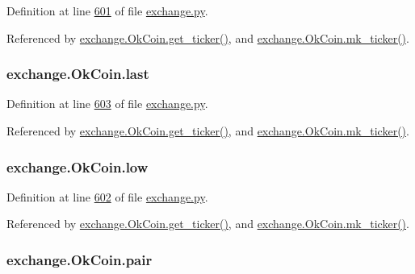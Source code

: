 Definition at line \hyperlink{exchange_8py_source_l00601}{601} of file \hyperlink{exchange_8py_source}{exchange.\+py}.



Referenced by \hyperlink{exchange_8py_source_l00608}{exchange.\+Ok\+Coin.\+get\+\_\+ticker()}, and \hyperlink{exchange_8py_source_l00622}{exchange.\+Ok\+Coin.\+mk\+\_\+ticker()}.

\subsubsection[{\texorpdfstring{last}{last}}]{\setlength{\rightskip}{0pt plus 5cm}exchange.\+Ok\+Coin.\+last}\hypertarget{classexchange_1_1_ok_coin_a726afbe3a75835fdcbe523aed8d6763c}{}\label{classexchange_1_1_ok_coin_a726afbe3a75835fdcbe523aed8d6763c}


Definition at line \hyperlink{exchange_8py_source_l00603}{603} of file \hyperlink{exchange_8py_source}{exchange.\+py}.



Referenced by \hyperlink{exchange_8py_source_l00608}{exchange.\+Ok\+Coin.\+get\+\_\+ticker()}, and \hyperlink{exchange_8py_source_l00622}{exchange.\+Ok\+Coin.\+mk\+\_\+ticker()}.

\subsubsection[{\texorpdfstring{low}{low}}]{\setlength{\rightskip}{0pt plus 5cm}exchange.\+Ok\+Coin.\+low}\hypertarget{classexchange_1_1_ok_coin_a1afa53e0ad63830d0585288abea42094}{}\label{classexchange_1_1_ok_coin_a1afa53e0ad63830d0585288abea42094}


Definition at line \hyperlink{exchange_8py_source_l00602}{602} of file \hyperlink{exchange_8py_source}{exchange.\+py}.



Referenced by \hyperlink{exchange_8py_source_l00608}{exchange.\+Ok\+Coin.\+get\+\_\+ticker()}, and \hyperlink{exchange_8py_source_l00622}{exchange.\+Ok\+Coin.\+mk\+\_\+ticker()}.

\subsubsection[{\texorpdfstring{pair}{pair}}]{\setlength{\rightskip}{0pt plus 5cm}exchange.\+Ok\+Coin.\+pair}\hypertarget{classexchange_1_1_ok_coin_a52f3b919f86565518d46c49c5b8f66a6}{}\label{classexchange_1_1_ok_coin_a52f3b919f86565518d46c49c5b8f66a6}


